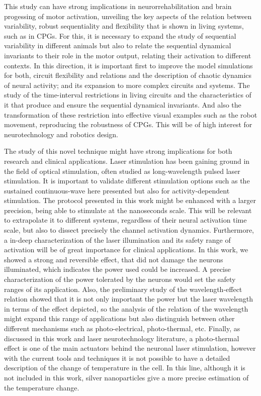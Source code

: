 This study can have strong implications in neurorrehabilitation and brain progessing of motor activation, unveiling the key aspects of the relation between variability, robust sequentiality and flexibility that is shown in living systems, such as in CPGs. For this, it is necessary to expand the study of sequential variability in different animals but also to relate the sequential dynamical invariants to their role in the motor output, relating their activation to different contexts. In this direction, it is important first to improve the model simulations for both, circuit flexibility and relations and the description of chaotic dynamics of neural activity; and its expansion to more complex circuits and systems. The study of the time-interval restrictions in living circuits and the characteristics of it that produce and ensure the sequential dynamical invariants. And also the transformation of these restriction into effective visual examples such as the robot movement, reproducing the robustness of CPGs. This will be of high interest for neurotechnology and robotics design. 


The study of this novel technique might have strong implications for both research and clinical applications. Laser stimulation has been gaining ground in the field of optical stimulation, often studied as long-wavelength pulsed laser stimulation. It is important to validate different stimulation options such as the sustained continuous-wave here presented but also for activity-dependent stimulation. The protocol presented in this work might be enhanced with a larger precision, being able to stimulate at the nanoseconds scale. This will be relevant to extrapolate it to different systems, regardless of their neural activation time scale, but also to dissect precisely the channel activation dynamics. Furthermore, a in-deep characterization of the laser illumination and its safety range of activation will be of great importance for clinical applications. In this work, we showed a strong and reversible effect, that did not damage the neurons illuminated, which indicates the power used could be increased. A precise characterization of the power tolerated by the neurons would set the safety ranges of its application. Also, the preliminary study of the wavelength-effect relation showed that it is not only important the power but the laser wavelength in terms of the effect depicted, so the analysis  of the relation of the wavelength might expand this range of applications but also distinguish between other different mechanisms such as photo-electrical, photo-thermal, etc. Finally, as discussed in this work and laser neurotechnology literature, a photo-thermal effect is one of the main actuators behind the neuronal laser stimulation, however with the current tools and techniques it is not possible to have a detailed description of the change of temperature in the cell. In this line, although it is not included in this work, silver nanoparticles give a more precise estimation of the temperature change. 




